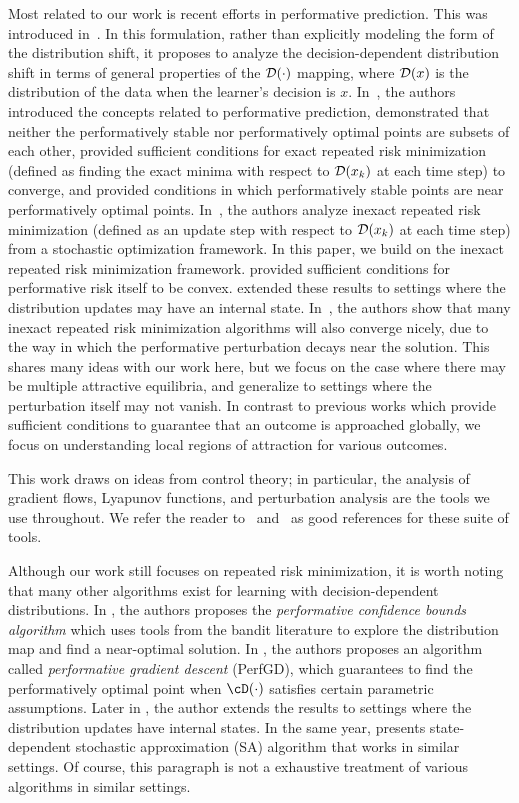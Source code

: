Most related to our work is recent efforts in performative prediction. This was introduced in~\citet{Perdomo:2020tz}. In this formulation, rather than explicitly modeling the form of the distribution shift, it proposes to analyze the decision-dependent distribution shift in terms of general properties of the $\mathcal{D}(\cdot)$ mapping, where $\mathcal{D}(x)$ is the distribution of the data when the learner's decision is $x$. In~\citet{Perdomo:2020tz}, the authors introduced the concepts related to performative prediction, demonstrated that neither the performatively stable nor performatively optimal points are subsets of each other, provided sufficient conditions for exact repeated risk minimization (defined as finding the exact minima with respect to $\mathcal{D}(x_k)$ at each time step) to converge, and provided conditions in which performatively stable points are near performatively optimal points. In~\citet{Mendler-Dunner:2020vd}, the authors analyze inexact repeated risk minimization (defined as an update step with respect to $\mathcal{D}(x_k)$ at each time step) from a stochastic optimization framework. In this paper, we build on the inexact repeated risk minimization framework. \citet{Miller:2021te} provided sufficient conditions for performative risk itself to be convex. \citet{Brown:2020wg} extended these results to settings where the distribution updates may have an internal state. 
In~\citet{Drusvyatskiy:2020wk}, the authors show that many inexact repeated risk minimization algorithms will also converge nicely, due to the way in which the performative perturbation decays near the solution. This shares many ideas with our work here, but we focus on the case where there may be multiple attractive equilibria, and generalize to settings where the perturbation itself may not vanish. 
In contrast to previous works which provide sufficient conditions to guarantee that an outcome is approached globally, we focus on understanding local regions of attraction for various outcomes.

This work draws on ideas from control theory; in particular, the analysis of gradient flows, Lyapunov functions, and perturbation analysis are the tools we use throughout. We refer the reader to~\citet{Hirsch:2012tx} and~\citet{Khalil:2001wj} as good references for these suite of tools.

Although our work still focuses on repeated risk minimization, it is worth noting that many other algorithms exist for learning with decision-dependent distributions. 
In \citet{Jag22}, the authors proposes the \textit{performative confidence bounds algorithm} which uses tools from the bandit literature to explore the distribution map and find a near-optimal solution. 
In \citet{Izzo21_1}, the authors proposes an algorithm called \textit{performative gradient descent} (PerfGD), which guarantees to find the performatively optimal point when $\cD(\cdot)$ satisfies certain parametric assumptions. Later in \citet{Izzo21_2}, the author extends the results to settings where the distribution updates have internal states. In the same year, \cite{Li21} presents state-dependent stochastic approximation (SA) algorithm that works in similar settings. Of course, this paragraph is not a exhaustive treatment of various algorithms in similar settings. 
